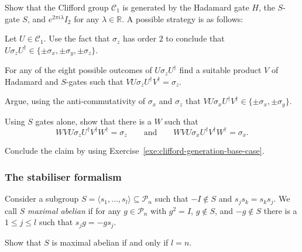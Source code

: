 \documentclass[a4paper, oneside, 12pt]{amsart}
\newcommand*{\PauliGroup}{\ensuremath{\mathcal{P}}}
\begin{document}
\begin{exercise}\label{exe:clifford-generation-base-case}
  Show that the Clifford group \(\mathcal{C}_{1}\) is generated by the Hadamard gate \(H\), the \(S\)-gate \(S\), and  \(e^{2\pi i \lambda}I_{2}\) for any \(\lambda \in \mathbb{R}\).
  A possible strategy is as follows:
  \begin{thmlist}
    \item Let \(U \in \mathcal{C}_{1}\). Use the fact that \(\sigma_{z}\) has order \(2\) to conclude that \(U\sigma_{z}U^{\dagger} \in \{\pm \sigma_{x}, \pm \sigma_{y}, \pm \sigma_{z}\}\).
    \item For any of the eight possible outcomes of \(U\sigma_{z}U^{\dagger}\) find a suitable product \(V\) of Hadamard and \(S\)-gates such that \(VU\sigma_{z}U^{\dagger}V^{\dagger} = \sigma_{z}\).
    \item Argue, using the anti-commutativity of \(\sigma_{x}\) and \(\sigma_{z}\) that \(VU\sigma_{x}U^{\dagger}V^{\dagger} \in\{\pm \sigma_{x}, \pm\sigma_{y}\}\).
    \item Using \(S\) gates alone, show that there is a \(W\) such that
    \begin{equation*}
      WVU\sigma_{z}U^{\dagger}V^{\dagger}W^{\dagger} = \sigma_{z} \qquad \text{and}\qquad WVU\sigma_{x}U^{\dagger}V^{\dagger}W^{\dagger} = \sigma_{x}.
    \end{equation*}
    \item Conclude the claim by using Exercise~\ref{exe:clifford-generation-base-case}.
  \end{thmlist}
\end{exercise}

\subsubsection*{The stabiliser formalism}

\begin{exercise}\label{exe:max-abelian}
  Consider a subgroup \(S= \langle s_{1}, \dots , s_{l}\rangle \subseteq \PauliGroup_{n}\) such that \(-I \notin S\) and \(s_{j}s_{k}= s_{k}s_{j}\).
  We call \(S\) \emph{maximal abelian} if for any \(g\in \PauliGroup_{n}\)  with \(g^{2}= I\), \(g\notin S\), and \(-g \notin S\) there is a \(1\leq j \leq l\) such that \(s_{j}g = -g s_{j}\).

  Show that \(S\) is maximal abelian if and only if \(l=n\).
\end{exercise}
\end{document}
